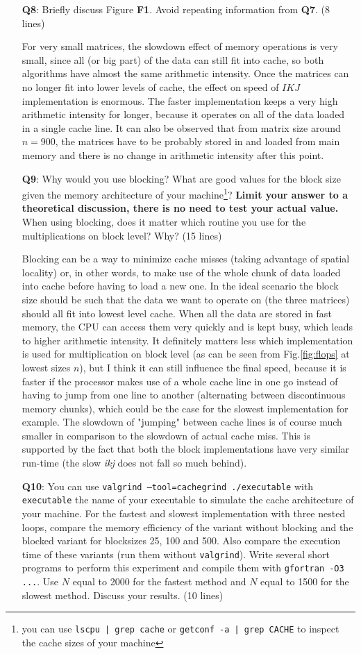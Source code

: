 \documentclass[a4paper]{article}
\newcommand{\answer}[1]{\vspace{-0.75em}\begin{framed} #1 \end{framed}\vspace{-0.75em}}
\begin{document}
\begin{itemize}
	\item[\textbf{Q8}:] Briefly discuss Figure \textbf{F1}. Avoid repeating information from \textbf{Q7}. (8 lines)
	\answer{ 
	For very small matrices, the slowdown effect of memory operations is very small, since all (or big part) of the data can still fit into cache, so both algorithms have almost the same arithmetic intensity. Once the matrices can no longer fit into lower levels of cache, the effect on speed of $ IKJ $ implementation is enormous. The faster implementation keeps a very high arithmetic intensity for longer, because it operates on all of the data loaded in a single cache line. It can also be observed that from matrix size around $ n=900 $, the matrices have to be probably stored in and loaded from main memory and there is no change in arithmetic intensity after this point.
}
	\item[\textbf{Q9}:]  Why would you use blocking? What are good values for the block size given the memory architecture of your machine\footnote{you can use \texttt{lscpu | grep cache} or \texttt{getconf -a | grep CACHE} to inspect the cache sizes of your machine}? \textbf{Limit your answer to a theoretical discussion, there is no need to test your actual value.} When using blocking, does it matter which routine you use for the multiplications on block level? Why? (15 lines) 
	\answer{
	Blocking can be a way to minimize cache misses (taking advantage of spatial locality) or, in other words, to make use of the whole chunk of data loaded into cache before having to load a new one. In the ideal scenario the block size should be such that the data we want to operate on (the three matrices) should all fit into lowest level cache. When all the data are stored in fast memory, the CPU can access them very quickly and is kept busy, which leads to higher arithmetic intensity. It definitely matters less which implementation is used for multiplication on block level (as can be seen from Fig.\ref{fig:flops} at lowest sizes $ n $), but I think it can still influence the final speed, because it is faster if the processor makes use of a whole cache line in one go instead of having to jump from one line to another (alternating between discontinuous memory chunks), which could be the case for the slowest implementation for example. The slowdown of "jumping" between cache lines is of course much smaller in comparison to the slowdown of actual cache miss. This is supported by the fact that both the block implementations have very similar run-time (the slow \textit{ikj} does not fall so much behind).
}
	\item[\textbf{Q10}:] You can use \texttt{valgrind --tool=cachegrind ./executable} with \texttt{executable} the name of your executable to simulate the cache architecture of your machine. For the fastest and slowest implementation with three nested loops, compare the memory efficiency of the variant without blocking and the blocked variant for blocksizes 25, 100 and 500. Also compare the execution time of these variants (run them without \texttt{valgrind}). Write several short programs to perform this experiment and compile them with \texttt{gfortran -O3 ...}. Use $N$ equal to 2000 for the fastest method and $N$ equal to 1500 for the slowest method. Discuss your results. (10 lines)

\end{itemize}
\end{document}
